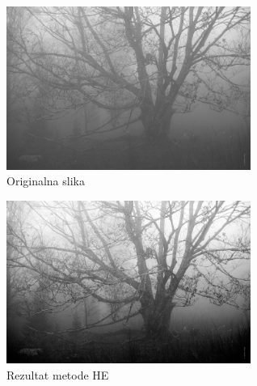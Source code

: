 \documentclass[12pt,a4paper]{article}
\theoremstyle{definition}
\theoremstyle{remark}
\theoremstyle{plain}
\begin{document}
\begin{multicols}{2}
\begin{figure}[H]
\centering
\includegraphics[width=8cm]{images/tree.jpg}
  \caption{Originalna slika}\label{river}
\end{figure}
\columnbreak
\begin{figure}[H]
\centering
\includegraphics[width=8cm]{images/global_HE.jpg}
  \caption{Rezultat metode HE}\label{river_output2}
\end{figure}
\end{multicols}
\end{document}
